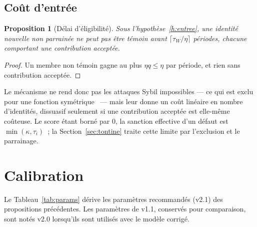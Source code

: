 \documentclass[11pt,a4paper]{article}
\theoremstyle{plain}
\newtheorem{proposition}{Proposition}
\theoremstyle{definition}
\theoremstyle{remark}
\newcommand{\1}{\mathbf{1}}
\begin{document}
\subsection{Coût d'entrée}

\begin{proposition}[Délai d'éligibilité]\label{prop:sybil}
Sous l'hypothèse~\ref{h:entree}, une identité nouvelle non parrainée ne peut pas
être témoin avant $\lceil\tau_W/\eta\rceil$ périodes, chacune comportant une
contribution acceptée.
\end{proposition}
\begin{proof}
Un membre non témoin gagne au plus $\eta q\le\eta$ par période, et rien sans
contribution acceptée.
\end{proof}

Le mécanisme ne rend donc pas les attaques Sybil impossibles --- ce qui est exclu
pour une fonction symétrique~\cite{cheng2005} --- mais leur donne un coût linéaire
en nombre d'identités, dissuasif seulement si une contribution acceptée est
elle-même coûteuse. Le score étant borné par 0, la sanction effective d'un
défaut est $\min(\kappa,\tau_i)$~; la Section~\ref{sec:tontine} traite cette
limite par l'exclusion et le parrainage.

\section{Calibration}
\label{sec:calibration}

Le Tableau~\ref{tab:params} dérive les paramètres recommandés (v2.1) des
propositions précédentes. Les paramètres de v1.1, conservés pour comparaison,
sont notés v2.0 lorsqu'ils sont utilisés avec le modèle corrigé.
\end{document}
